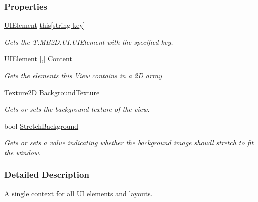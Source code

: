 \subsubsection*{Properties}
\begin{DoxyCompactItemize}
\item 
\hyperlink{class_m_b2_d_1_1_u_i_1_1_u_i_element}{U\+I\+Element} \hyperlink{class_m_b2_d_1_1_u_i_1_1_u_i_view_aa054a491e5acf3816240b671db3212ce}{this\mbox{[}string key\mbox{]}}
\begin{DoxyCompactList}\small\item\em Gets the T\+:\+M\+B2\+D.\+U\+I.\+U\+I\+Element with the specified key. \end{DoxyCompactList}\item 
\hyperlink{class_m_b2_d_1_1_u_i_1_1_u_i_element}{U\+I\+Element} \mbox{[},\mbox{]} \hyperlink{class_m_b2_d_1_1_u_i_1_1_u_i_view_a873fb2ef0e28bf1d96056e43a6fe18da}{Content}
\begin{DoxyCompactList}\small\item\em Gets the elements this View contains in a 2D array \end{DoxyCompactList}\item 
Texture2D \hyperlink{class_m_b2_d_1_1_u_i_1_1_u_i_view_a9d5bf0c4239df5a79429921bda80a1ad}{Background\+Texture}
\begin{DoxyCompactList}\small\item\em Gets or sets the background texture of the view. \end{DoxyCompactList}\item 
bool \hyperlink{class_m_b2_d_1_1_u_i_1_1_u_i_view_a715db505a27aeb27dd14c1108bda322f}{Stretch\+Background}
\begin{DoxyCompactList}\small\item\em Gets or sets a value indicating whether the background image shoudl stretch to fit the window. \end{DoxyCompactList}\end{DoxyCompactItemize}


\subsubsection{Detailed Description}
A single context for all \hyperlink{namespace_m_b2_d_1_1_u_i}{UI} elements and layouts. 



